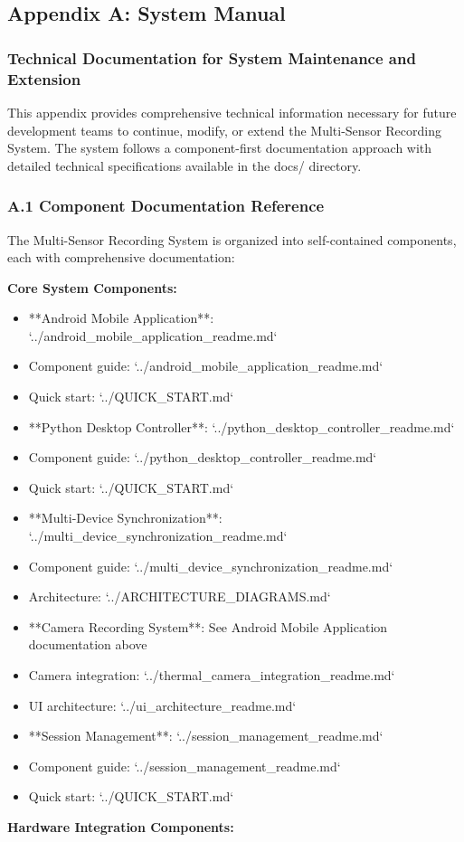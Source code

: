 \documentclass[11pt,a4paper]{article}
\begin{document}
\subsection{Appendix A: System Manual}

\subsubsection{Technical Documentation for System Maintenance and Extension}

This appendix provides comprehensive technical information necessary for future development teams to continue, modify,
or extend the Multi-Sensor Recording System. The system follows a component-first documentation approach with detailed
technical specifications available in the docs/ directory.

\subsubsection{A.1 Component Documentation Reference}

The Multi-Sensor Recording System is organized into self-contained components, each with comprehensive documentation:

\textbf{Core System Components:}

\begin{itemize}
\item **Android Mobile Application**: `../android_mobile_application_readme.md`
\item Component guide: `../android_mobile_application_readme.md`
\item Quick start: `../QUICK_START.md`

\item **Python Desktop Controller**: `../python_desktop_controller_readme.md`
\item Component guide: `../python_desktop_controller_readme.md`
\item Quick start: `../QUICK_START.md`

\item **Multi-Device Synchronization**: `../multi_device_synchronization_readme.md`
\item Component guide: `../multi_device_synchronization_readme.md`
\item Architecture: `../ARCHITECTURE_DIAGRAMS.md`

\item **Camera Recording System**: See Android Mobile Application documentation above
\item Camera integration: `../thermal_camera_integration_readme.md`
\item UI architecture: `../ui_architecture_readme.md`

\item **Session Management**: `../session_management_readme.md`
\item Component guide: `../session_management_readme.md`
\item Quick start: `../QUICK_START.md`

\end{itemize}
\textbf{Hardware Integration Components:}
\end{document}
